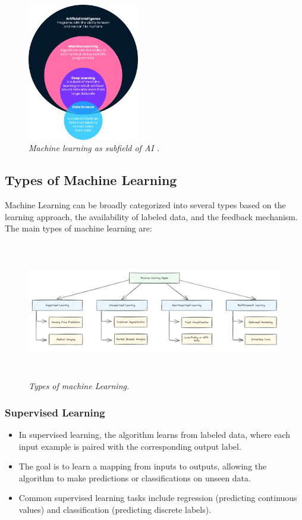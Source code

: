 \begin{figure}[htpb]
    \centering
    \includegraphics[width=\textwidth,height=6cm,keepaspectratio=true]{ml.png}
    \caption{
        \it{Machine learning as subfield of AI \cite{datacamp:ml}.}
    }
\end{figure}

\subsection{Types of Machine Learning}

Machine Learning can be broadly categorized into several types based on the learning approach, the availability of labeled data, and the feedback mechanism. The main types of machine learning are:

\begin{figure}[htpb]
    \centering
    \includegraphics[width=\textwidth,height=6cm,keepaspectratio=true]{ml-types.png}
    \caption{
        \it{Types of machine Learning.}
    }
\end{figure}

\subsubsection*{Supervised Learning}

\begin{itemize}
    \item{In supervised learning, the algorithm learns from labeled data, where each input example is paired with the corresponding output label.}
    \item{The goal is to learn a mapping from inputs to outputs, allowing the algorithm to make predictions or classifications on unseen data.}
    \item{Common supervised learning tasks include regression (predicting continuous values) and classification (predicting discrete labels).}
\end{itemize}

